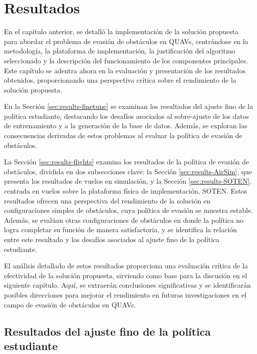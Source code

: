 \chapter{Resultados}
\label{capitulo6}

En el capítulo anterior, se detalló la implementación de la solución propuesta para abordar el problema de evasión de obstáculos en QUAVs, centrándose en la metodología, la plataforma de implementación, la justificación del algoritmo seleccionado y la descripción del funcionamiento de los componentes principales. Este capítulo se adentra ahora en la evaluación y presentación de los resultados obtenidos, proporcionando una perspectiva crítica sobre el rendimiento de la solución propuesta.

En la Sección  \ref{sec:results-finetune} se examinan los resultados del ajuste fino de la política estudiante, destacando los desafíos asociados al sobre-ajuste de los datos de entrenamiento y a la generación de la base de datos. Además, se exploran las consecuencias derivadas de estos problemas al evaluar la política de evasión de obstáculos.

La Sección  \ref{sec:results-flights} examina los resultados de la política de evasión de obstáculos, dividida en dos subsecciones clave: la Sección  \ref{sec:results-AirSim}, que presenta los resultados de vuelos en simulación, y la Sección  \ref{sec:results-SOTEN}, centrada en vuelos sobre la plataforma física de implementación, SOTEN. Estos resultados ofrecen una perspectiva del rendimiento de la solución en configuraciones simples de obstáculos, cuya política de evasión se muestra estable. Además, se evalúan otras configuraciones de obstáculos en donde la política no logra completar su función de manera satisfactoria, y se identifica la relación entre este resultado y los desafíos asociados al ajuste fino de la política estudiante.

El análisis detallado de estos resultados proporciona una evaluación crítica de la efectividad de la solución propuesta, sirviendo como base para la discusión en el siguiente capítulo. Aquí, se extraerán conclusiones significativas y se identificarán posibles direcciones para mejorar el rendimiento en futuras investigaciones en el campo de evasión de obstáculos en QUAVs.

\section{Resultados del ajuste fino de la política estudiante}

